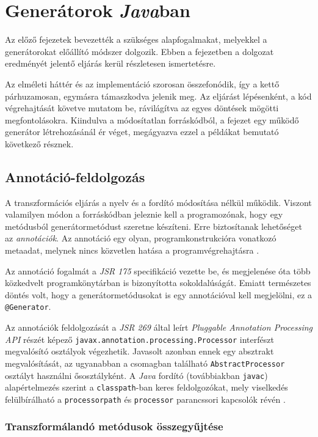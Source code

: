 \chapter{Generátorok \textit{Java}ban}

Az előző fejezetek bevezették a szükséges alapfogalmakat, melyekkel a generátorokat előállító módszer dolgozik. Ebben a fejezetben a dolgozat eredményét jelentő eljárás kerül részletesen ismertetésre.

Az elméleti háttér és az implementáció szorosan összefonódik, így a kettő párhuzamosan, egymásra támaszkodva jelenik meg. Az eljárást lépésenként, a kód végrehajtását követve mutatom be, rávilágítva az egyes döntések mögötti megfontolásokra. Kiindulva a módosítatlan forráskódból, a fejezet egy működő generátor létrehozásánál ér véget, megágyazva ezzel a példákat bemutató következő résznek.

\section{Annotáció-feldolgozás}

A transzformációs eljárás a nyelv és a fordító módosítása nélkül működik. Viszont valamilyen módon a forráskódban jeleznie kell a programozónak, hogy egy metódusból generátormetódust szeretne készíteni. Erre biztosítanak lehetőséget az \textit{annotációk}. Az annotáció egy olyan, programkonstrukcióra vonatkozó metaadat, melynek nincs közvetlen hatása a programvégrehajtásra \cite{JLS8}.

Az annotáció fogalmát a \textit{JSR 175} specifikáció vezette be, és megjelenése óta több közkedvelt programkönytárban is bizonyította sokoldalúságát. Emiatt természetes döntés volt, hogy a generátormetódusokat is egy annotációval kell megjelölni, ez a \texttt{@Generator}.

Az annotációk feldolgozását a \textit{JSR 269} által leírt \textit{Pluggable Annotation Processing API} részét képező \texttt{javax.annotation.processing.Processor} interfészt megvalósító osztályok végezhetik. Javasolt azonban ennek egy absztrakt megvalósítását, az ugyanabban a csomagban található \texttt{AbstractProcessor} osztályt használni ősosztályként. A \textit{Java} fordító (továbbiakban \texttt{javac}) alapértelmezés szerint a \texttt{classpath}-ban keres feldolgozókat, mely viselkedés felülbírálható a \texttt{processorpath} és \texttt{processor} parancssori kapcsolók révén \cite{JavacOptions}.

\subsection{Transzformálandó metódusok összegyűjtése}

